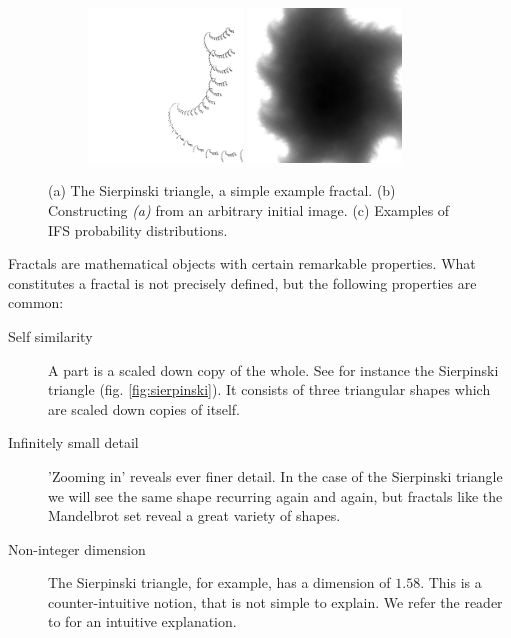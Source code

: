 \documentclass[10pt,a4paper,oneside]{article}
\theoremstyle{definition}
\begin{document}
\begin{figure}[b]
\begin{subfigure}[b]{0.3\textwidth}
    \includegraphics[width=0.45\textwidth]{../img/random010.png}
    \includegraphics[width=0.45\textwidth]{../img/mvn1k.png}
    \caption{}
    \label{fig:measures}
    
  \end{subfigure}
  \caption{\small (a) The Sierpinski triangle, a simple example fractal. (b) Constructing \textit{(a)} from an arbitrary initial image. (c) Examples of IFS probability distributions.}
  \label{fig:examples}
\end{figure}

Fractals are mathematical objects with certain remarkable properties. What constitutes a fractal is not precisely defined\footnotemark, but the following properties are common:

\begin{description}
  \item[Self similarity] A part is a scaled down copy of the whole. See for instance the Sierpinski triangle (fig. \ref{fig:sierpinski}). It consists of three triangular shapes which are scaled down copies of itself.
  \item[Infinitely small detail] 'Zooming in' reveals ever finer detail. In the case of the Sierpinski triangle we will see the same shape recurring again and again, but fractals like the Mandelbrot set reveal a great variety of shapes.
  \item[Non-integer dimension] The Sierpinski triangle, for example, has a dimension of $1.58$. This is a counter-intuitive notion, that is not simple to explain. We refer the reader to \cite{schroeder2009fractals} for an intuitive explanation.
\end{description}
\end{document}

